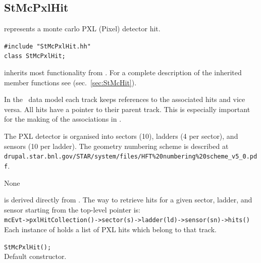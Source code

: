 %
%
\subsection{StMcPxlHit}
 
\label{sec:StMcPxlHit}
\begin{Entry}
\item[Summary]
     represents a monte carlo PXL (Pixel) detector hit.

\item[Synopsis]
    \verb+#include "StMcPxlHit.hh"+\\
    \verb+class StMcPxlHit;+\\

\item[Description]
     inherits most functionality from .
    For a complete description of the inherited member functions see
     (sec.~\ref{sec:StMcHit}).

    In the \StMcEvent\ data model each track keeps references to the
    associated hits and vice versa.  All hits have a pointer to their
    parent track.  This is especially important for the making of the
    associations in \StAssociationMaker.

    The PXL detector is organised into sectors (10), ladders (4 per
    sector), and sensors (10 per ladder).  The geometry numbering
    scheme is described at
    \texttt{drupal.star.bnl.gov/STAR/system/files/HFT\%20numbering\%20scheme\_v5\_0.pdf}.

\item[Persistence]
    None

\item[Related Classes]
     is derived directly from .
    The way to retrieve hits for a given sector, ladder, and sensor
    starting from the top-level  pointer is:\\
    \verb+mcEvt->pxlHitCollection()->sector(s)->ladder(ld)->sensor(sn)->hits()+\\
    Each instance of  holds a list of PXL hits
    which belong to that track.

\item[Public\\ Constructors]
    \verb+StMcPxlHit();+\\
    Default constructor.


\end{Entry}
